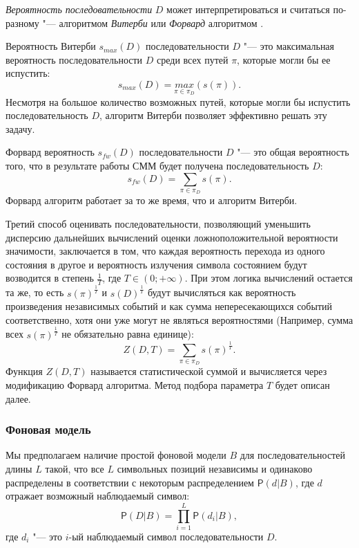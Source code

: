 \documentclass[specialist,
substylefile = spbu_report.rtx,
subf,href,colorlinks=true, 12pt]{disser}
\begin{document}
			\textit{Вероятность последовательности} $D$ может интерпретироваться и считаться по-разному "--- алгоритмом \textit{Витерби} или \textit{Форвард} алгоритмом \cite{Dugad1996, Compeau2015a}.
			
			Вероятность Витерби $s_{max}(D)$ последовательности $D$ "--- это максимальная вероятность последовательности $D$ среди всех путей $\pi$, которые могли бы ее испустить:
			\begin{equation*}
				s_{max}(D) = \underset{\pi \in \pi_{D}}{max}(s(\pi)). \label{eq:1}
			\end{equation*}
			Несмотря на большое количество возможных путей, которые могли бы испустить последовательность $D$, алгоритм Витерби позволяет эффективно решать эту задачу.
			
			Форвард вероятность $s_{fw}(D)$ последовательности $D$ "--- это общая вероятность того, что в результате работы СММ будет получена последовательность $D$:
			\begin{equation*}
				s_{fw}(D) = \sum_{\pi \in \pi_{D}}s(\pi). \label{eq:2}
			\end{equation*}
			Форвард алгоритм работает за то же время, что и алгоритм Витерби.
			
			Третий способ оценивать последовательности, позволяющий уменьшить дисперсию дальнейших вычислений оценки ложноположительной вероятности значимости, заключается в том, что каждая вероятность перехода из одного состояния в другое и вероятность излучения символа состоянием будут возводится в степень $\frac{1}{T}$, где $T \in (0; +\infty)$. При этом логика вычислений остается та же, то есть $s(\pi)^{\frac{1}{T}}$ и $s(D)^{\frac{1}{T}}$ будут вычисляться как вероятность произведения независимых событий и как сумма непересекающихся событий соответственно, хотя они уже могут не являться вероятностями (Например, сумма всех $s(\pi)^\frac{1}{T}$ не обязательно равна единице):
			\begin{equation*}
				Z(D, T)	= \sum_{\pi \in \pi_{D}}s(\pi)^{\frac{1}{T}}. \label{eq:3}
			\end{equation*}		
			Функция $Z(D, T)$ называется статистической суммой и вычисляется через модификацию Форвард алгоритма. Метод подбора параметра $T$ будет описан далее.
			
			\subsubsection{Фоновая модель}
			Мы предполагаем наличие простой фоновой модели $B$ для последовательностей длины $L$ такой, что все $L$ символьных позиций независимы и одинаково распределены в соответствии с некоторым распределением $\mathsf{P}(d|B)$, где $d$ отражает возможный наблюдаемый символ:
			\begin{equation}
				\mathsf{P}(D|B) = \prod_{i=1}^{L}\mathsf{P}(d_{i}|B), \label{eq:4}
			\end{equation}
			где $d_{i}$ "--- это $i$-ый наблюдаемый символ последовательности $D$.
			
\end{document}
